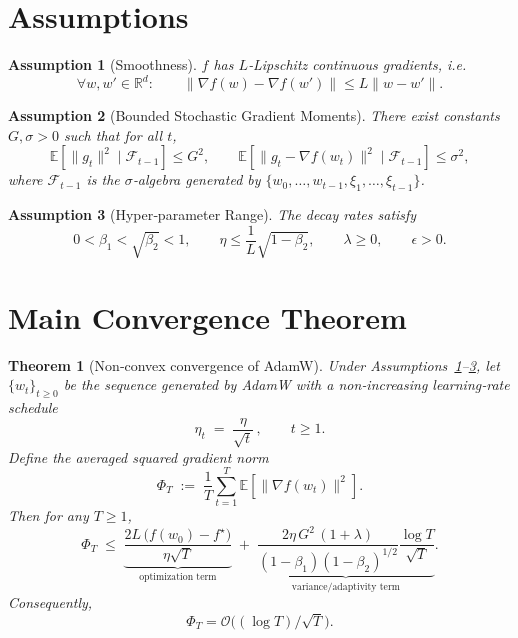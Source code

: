 \documentclass{article}
\newtheorem{theorem}{Theorem}
\newtheorem{assumption}{Assumption}
\newcommand{\EE}{\mathbb{E}}
\newcommand{\RR}{\mathbb{R}}
\begin{document}
\newpage
\section*{Assumptions}
\begin{assumption}[Smoothness]\label{as:smooth}
$f$ has $L$‑Lipschitz continuous gradients, i.e.
\[
\forall w,w'\in\RR^{d}:\qquad
\|\nabla f(w)-\nabla f(w')\|\le L\|w-w'\|.
\]
\end{assumption}
\begin{assumption}[Bounded Stochastic Gradient Moments]\label{as:bounded}
There exist constants $G,\sigma>0$ such that for all $t$,
\[
\EE\!\left[\|g_t\|^2\mid \mathcal{F}_{t-1}\right]\le G^2,
\qquad
\EE\!\left[\|g_t-\nabla f(w_t)\|^2\mid \mathcal{F}_{t-1}\right]\le\sigma^2,
\]
where $\mathcal{F}_{t-1}$ is the $\sigma$‑algebra generated by
$\{w_0,\dots,w_{t-1},\xi_1,\dots,\xi_{t-1}\}$.
\end{assumption}
\begin{assumption}[Hyper‑parameter Range]\label{as:hyper}
The decay rates satisfy
\[
0<\beta_1<\sqrt{\beta_2}<1,\qquad
\eta\le \frac{1}{L}\sqrt{1-\beta_2},\qquad
\lambda\ge0,\qquad\epsilon>0.
\]
\end{assumption}

\section*{Main Convergence Theorem}
\begin{theorem}[Non‑convex convergence of AdamW]\label{thm:adamw}
Under Assumptions~\ref{as:smooth}–\ref{as:hyper},
let $\{w_t\}_{t\ge0}$ be the sequence generated by AdamW with a
non‑increasing learning‑rate schedule
\[
\eta_t \;=\; \frac{\eta}{\sqrt{t}}\,,\qquad t\ge1 .
\]
Define the averaged squared gradient norm
\[
\Phi_T \;:=\; \frac{1}{T}\sum_{t=1}^{T}
        \EE\!\left[\|\nabla f(w_t)\|^2\right].
\]
Then for any $T\ge 1$,
\[
\Phi_T \;\le\;
\underbrace{\frac{2L\,\bigl(f(w_0)-f^\star\bigr)}{\eta\sqrt{T}}}_{\text{optimization term}}
\;+\;
\underbrace{
\frac{2\eta\,G^2\,(1+\lambda)}{(1-\beta_1)(1-\beta_2)^{1/2}}
\frac{\log T}{\sqrt{T}}
}_{\text{variance/adaptivity term}} .
\]
Consequently,
\[
\Phi_T = \mathcal{O}\!\bigl((\log T)/\sqrt{T}\bigr).
\]
\end{theorem}
\end{document}
